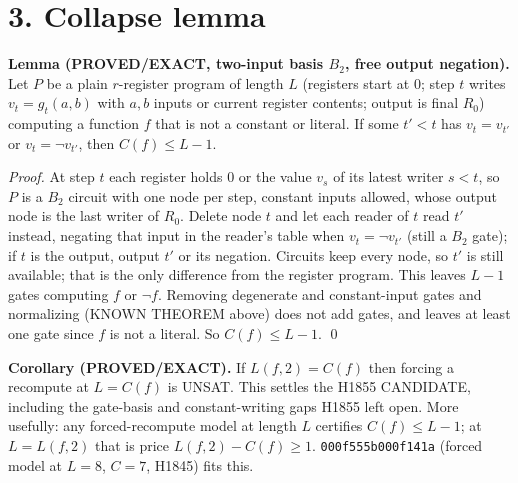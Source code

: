 \documentclass[11pt]{article}
\begin{document}
\section*{3. Collapse lemma}
\textbf{Lemma (PROVED/EXACT, two-input basis $B_2$, free output negation).} Let $P$ be a plain $r$-register program of length $L$ (registers start at $0$; step $t$ writes $v_t=g_t(a,b)$ with $a,b$ inputs or current register contents; output is final $R_0$) computing a function $f$ that is not a constant or literal. If some $t'<t$ has $v_t=v_{t'}$ or $v_t=\neg v_{t'}$, then $C(f)\le L-1$.

\emph{Proof.} At step $t$ each register holds $0$ or the value $v_s$ of its latest writer $s<t$, so $P$ is a $B_2$ circuit with one node per step, constant inputs allowed, whose output node is the last writer of $R_0$. Delete node $t$ and let each reader of $t$ read $t'$ instead, negating that input in the reader's table when $v_t=\neg v_{t'}$ (still a $B_2$ gate); if $t$ is the output, output $t'$ or its negation. Circuits keep every node, so $t'$ is still available; that is the only difference from the register program. This leaves $L-1$ gates computing $f$ or $\neg f$. Removing degenerate and constant-input gates and normalizing (KNOWN THEOREM above) does not add gates, and leaves at least one gate since $f$ is not a literal. So $C(f)\le L-1$. \qed

\textbf{Corollary (PROVED/EXACT).} If $L(f,2)=C(f)$ then forcing a recompute at $L=C(f)$ is UNSAT. This settles the H1855 CANDIDATE, including the gate-basis and constant-writing gaps H1855 left open. More usefully: any forced-recompute model at length $L$ certifies $C(f)\le L-1$; at $L=L(f,2)$ that is price $L(f,2)-C(f)\ge 1$. \texttt{000f555b000f141a} (forced model at $L=8$, $C=7$, H1845) fits this.
\end{document}

